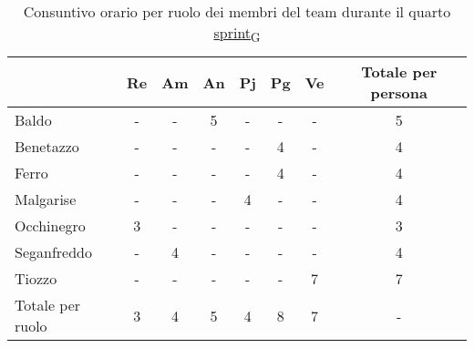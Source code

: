 \begin{table}[!h]
	\centering
	\begin{tabular}{ | l | c | c | c | c | c | c | c | }
		\hline
		\textbf{}        & \textbf{Re} & \textbf{Am} & \textbf{An} & \textbf{Pj} & \textbf{Pg} & \textbf{Ve} & \textbf{Totale per persona} \\
		\hline
		Baldo            & -           & -           & 5           & -           & -           & -           & 5                           \\
		Benetazzo        & -           & -           & -           & -           & 4           & -           & 4                           \\
		Ferro            & -           & -           & -           & -           & 4           & -           & 4                           \\
		Malgarise        & -           & -           & -           & 4           & -           & -           & 4                           \\
		Occhinegro       & 3           & -           & -           & -           & -           & -           & 3                           \\
		Seganfreddo      & -           & 4           & -           & -           & -           & -           & 4                           \\
		Tiozzo           & -           & -           & -           & -           & -           & 7           & 7                           \\
		\hline
		Totale per ruolo & 3           & 4           & 5           & 4           & 8           & 7           & -                           \\
		\hline
	\end{tabular}
	\caption{Consuntivo orario per ruolo dei membri del team durante il quarto \href{https://7last.github.io/docs/rtb/documentazione-interna/glossario\#sprint}{sprint\textsubscript{G}}}
	
\end{table}
\newpage
{}
